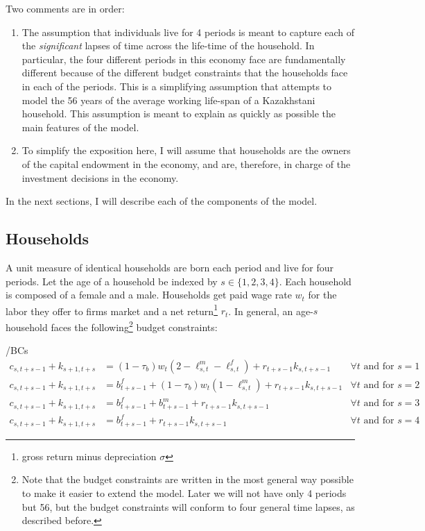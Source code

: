 \documentclass[BufferStockTheory]{subfiles}
\begin{document}
 Two comments are in order:
 	\begin{enumerate}
 		\item  The assumption that individuals live for 4 periods is meant to capture each of the \emph{significant} lapses of time across the life-time of the household. In particular, the four different periods in this economy face are fundamentally different because of the different budget constraints that the households face in each of the periods. This is a simplifying assumption that attempts to model the 56 years of the average working life-span of a Kazakhstani household. This assumption is meant to explain as quickly as possible the main features of the model. 
 		\item To simplify the exposition here, I will assume that households are the owners of the capital endowment in the economy, and are, therefore, in charge of the investment decisions in the economy. 
 	\end{enumerate}

 In the next sections, I will describe each of the components of the model.

 \subsection{Households}

 A unit measure of identical households are born each period and live for four periods. Let the age of a household be indexed by $s\in\{1,2,3,4\}.$ Each household is composed of a female and a male. Households get paid wage rate $w_t$ for the labor they offer to firms market and a net return\footnote{gross return minus depreciation $\sigma$} $r_t$. In general, an age-$s$ household
 faces the following\footnote{Note that the budget constraints are written in the most general way possible to make it easier to extend the model. Later we will not have only 4 periods but 56, but the budget constraints will conform to four general time lapses, as described before. } budget constraints:
 \begin{verbatimwrite}{\EqDir/BCs}
	\label{eq:BCs}
 	 \begin{align}
 	c_{s,t+s-1} + k_{s+1,t+s} &= (1-\tau_b)w_t (2-\ell_{s,t}^m - \ell_{s,t}^f) + r_{t+s-1}k_{s,t+s-1} & \forall t\text{ and for $s=1$} \\
 	c_{s,t+s-1} + k_{s+1,t+s} &= b_{t+s-1}^f+(1-\tau_b)w_t (1-\ell_{s,t}^m ) + r_{t+s-1}k_{s,t+s-1} & \forall t\text{ and for $s=2$} \\
 	c_{s,t+s-1} + k_{s+1,t+s} &= b_{t+s-1}^f+ b_{t+s-1}^m  + r_{t+s-1}k_{s,t+s-1} & \forall t\text{ and for $s=3$} \\
 	c_{s,t+s-1} + k_{s+1,t+s} &= b_{t+s-1}^f + r_{t+s-1}k_{s,t+s-1} & \forall t\text{ and for $s=4$} 
 \end{align}
\end{verbatimwrite}

\end{document}
